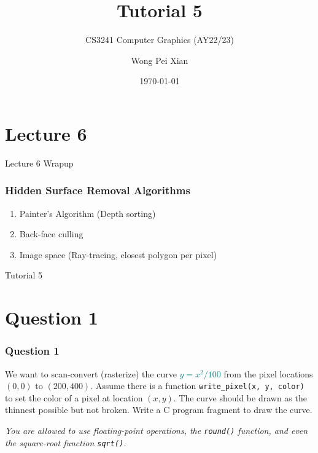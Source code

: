 \documentclass{beamer}
\title{Tutorial 5}
\subtitle{CS3241 Computer Graphics (AY22/23)}
\date{\today}
\author{Wong Pei Xian}
\institute[]{\email{e0389023@u.nus.edu}}
\begin{document}
\frame[plain]{\titlepage}

\section{Lecture 6}

\begin{frame}
    \AlegreyaExtraBold \LARGE
    Lecture 6 Wrapup
\end{frame}

\begin{frame}
    \frametitle{Hidden Surface Removal Algorithms}

    \begin{enumerate}
        \item Painter's Algorithm (Depth sorting)
        \item Back-face culling
        \item Image space (Ray-tracing, closest polygon per pixel)
    \end{enumerate}

\end{frame}

\begin{frame}
    \AlegreyaExtraBold \LARGE
    Tutorial 5
\end{frame}

\section{Question 1}

\begin{frame}
    \frametitle{Question 1}
    We want to scan-convert (rasterize) the curve \textcolor{teal}{$y = x^2 / 100$} from the pixel locations $(0, 0)$ to $(200, 400)$. 
    Assume there is a function \texttt{write\_pixel(x, y, color)} to set the color of a pixel at location $(x, y)$. 
    The curve should be drawn as the thinnest possible but not broken. 
    Write a C program fragment to draw the curve. 

    \vspace{1em}
    
    \textit{You are allowed to use floating-point operations, the \texttt{round()} function, and even the square-root function \texttt{sqrt()}.}
\end{frame}
\end{document}
